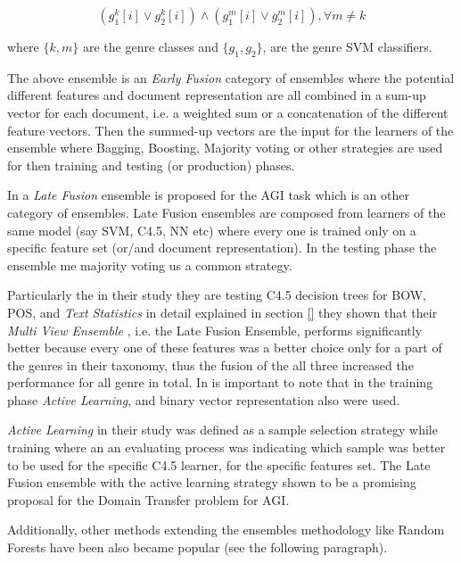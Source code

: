 \begin{equation}\label{eq:office_doc_ensemble}
	(g^{k}_{1}[i] \vee g^{k}_{2}[i])  \wedge  (g^{m}_{1}[i] \vee g^{m}_{2}[i]) ,   \forall m \neq k
\end{equation}

where $\{k, m\}$ are the genre classes and $\{g_{1}, g_{2}\}$, are the genre SVM classifiers.
		
The above ensemble is an \textit{Early Fusion} category of ensembles where the potential different features and document representation are all combined in a sum-up vector for each document, i.e. a weighted sum or a concatenation of the different feature vectors. Then the summed-up vectors are the input for the learners of the ensemble where Bagging, Boosting, Majority voting or other strategies are used for then training and testing (or production) phases.

In \parencite{finn2006learning} a \textit{Late Fusion} ensemble is proposed for the AGI task which is an other category of ensembles. Late Fusion ensembles are composed from learners of the same model (say SVM, C4.5, NN etc) where every one is trained only on a specific feature set (or/and document representation). In the testing phase the ensemble me majority voting us a common strategy. 

Particularly the in their study they are testing C4.5 decision trees for BOW, POS, and \textit{Text Statistics} in detail explained in  section \ref{} they shown that their \textit{Multi View Ensemble }, i.e. the Late Fusion Ensemble, performs significantly better because every one of these features was a better choice only for a part of the genres in their taxonomy, thus the fusion of the all three increased the performance for all genre in total. In is important to note that in the training phase \textit{Active Learning}, and binary vector representation also were used. 

\textit{Active Learning} in their study was defined as a sample selection strategy while training where an an evaluating process was indicating which sample was better to be used for the specific C4.5 learner, for the specific features set. The Late Fusion ensemble with the active learning strategy shown to be a promising proposal for the Domain Transfer problem for AGI.

Additionally, other methods extending the ensembles methodology like Random Forests have been also became popular (see the following paragraph).

